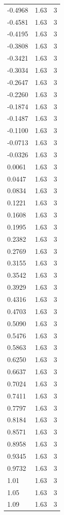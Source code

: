 \begin{longtable}{lrr}
  -0.4968 & 1.63 & 3 \\
  -0.4581 & 1.63 & 3 \\
  -0.4195 & 1.63 & 3 \\
  -0.3808 & 1.63 & 3 \\
  -0.3421 & 1.63 & 3 \\
  -0.3034 & 1.63 & 3 \\
  -0.2647 & 1.63 & 3 \\
  -0.2260 & 1.63 & 3 \\
  -0.1874 & 1.63 & 3 \\
  -0.1487 & 1.63 & 3 \\
  -0.1100 & 1.63 & 3 \\
  -0.0713 & 1.63 & 3 \\
  -0.0326 & 1.63 & 3 \\
  0.0061 & 1.63 & 3 \\
  0.0447 & 1.63 & 3 \\
  0.0834 & 1.63 & 3 \\
  0.1221 & 1.63 & 3 \\
  0.1608 & 1.63 & 3 \\
  0.1995 & 1.63 & 3 \\
  0.2382 & 1.63 & 3 \\
  0.2769 & 1.63 & 3 \\
  0.3155 & 1.63 & 3 \\
  0.3542 & 1.63 & 3 \\
  0.3929 & 1.63 & 3 \\
  0.4316 & 1.63 & 3 \\
  0.4703 & 1.63 & 3 \\
  0.5090 & 1.63 & 3 \\
  0.5476 & 1.63 & 3 \\
  0.5863 & 1.63 & 3 \\
  0.6250 & 1.63 & 3 \\
  0.6637 & 1.63 & 3 \\
  0.7024 & 1.63 & 3 \\
  0.7411 & 1.63 & 3 \\
  0.7797 & 1.63 & 3 \\
  0.8184 & 1.63 & 3 \\
  0.8571 & 1.63 & 3 \\
  0.8958 & 1.63 & 3 \\
  0.9345 & 1.63 & 3 \\
  0.9732 & 1.63 & 3 \\
  1.01 & 1.63 & 3 \\
  1.05 & 1.63 & 3 \\
  1.09 & 1.63 & 3 \\

\end{longtable}
